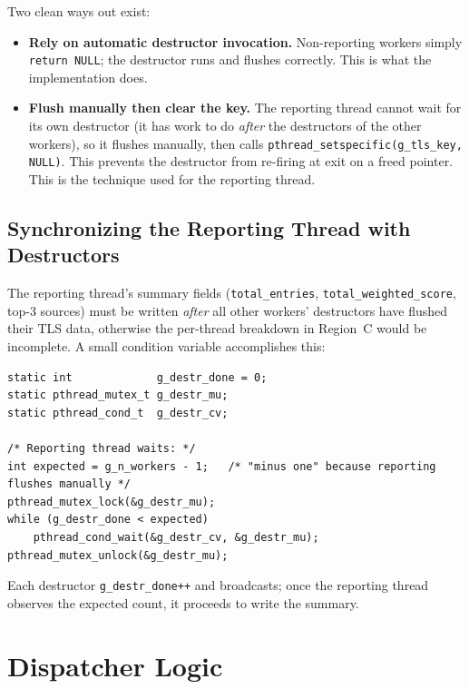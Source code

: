 \documentclass[11pt,a4paper]{article}
\newcommand{\code}[1]{\texttt{\small #1}}
\begin{document}
Two clean ways out exist:

\begin{itemize}
    \item \textbf{Rely on automatic destructor invocation.} Non-reporting
        workers simply \code{return NULL}; the destructor runs and
        flushes correctly. This is what the implementation does.

    \item \textbf{Flush manually then clear the key.} The reporting
        thread cannot wait for its own destructor (it has work to do
        \emph{after} the destructors of the other workers), so it
        flushes manually, then calls
        \code{pthread\_setspecific(g\_tls\_key, NULL)}. This prevents
        the destructor from re-firing at exit on a freed pointer. This
        is the technique used for the reporting thread.
\end{itemize}

\subsection{Synchronizing the Reporting Thread with Destructors}

The reporting thread's summary fields (\code{total\_entries},
\code{total\_weighted\_score}, top-3 sources) must be written
\emph{after} all other workers' destructors have flushed their TLS data,
otherwise the per-thread breakdown in Region~C would be incomplete. A
small condition variable accomplishes this:

\begin{lstlisting}[style=Cstyle]
static int             g_destr_done = 0;
static pthread_mutex_t g_destr_mu;
static pthread_cond_t  g_destr_cv;

/* Reporting thread waits: */
int expected = g_n_workers - 1;   /* "minus one" because reporting flushes manually */
pthread_mutex_lock(&g_destr_mu);
while (g_destr_done < expected)
    pthread_cond_wait(&g_destr_cv, &g_destr_mu);
pthread_mutex_unlock(&g_destr_mu);
\end{lstlisting}

Each destructor \code{g\_destr\_done++} and broadcasts; once the
reporting thread observes the expected count, it proceeds to write the
summary.

\section{Dispatcher Logic}
\end{document}
